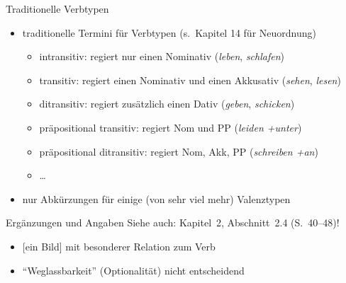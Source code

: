 \begin{frame}
  {Traditionelle Verbtypen}
  \pause
  \begin{itemize}[<+->]
    \item traditionelle Termini für Verbtypen (s.\ Kapitel 14 für Neuordnung)
      \Halbzeile
      \begin{itemize}[<+->]
        \item \alert{intransitiv}: regiert nur einen Nominativ (\textit{leben}, \textit{schlafen})
          \Viertelzeile
        \item \alert{transitiv}: regiert einen Nominativ und einen Akkusativ (\textit{sehen}, \textit{lesen})
          \Viertelzeile
        \item \alert{ditransitiv}: regiert zusätzlich einen Dativ (\textit{geben}, \textit{schicken})
          \Viertelzeile
        \item \alert{präpositional transitiv}: regiert Nom und PP (\textit{leiden +unter})
          \Viertelzeile
        \item \alert{präpositional ditransitiv}: regiert Nom, Akk, PP (\textit{schreiben +an})
          \Viertelzeile
        \item \ldots
          \Zeile
      \end{itemize}
    \item nur Abkürzungen für einige (von sehr viel mehr) \alert{Valenztypen}
  \end{itemize}
\end{frame}

\begin{frame}
  {Ergänzungen und Angaben}
  \pause
  Siehe auch: Kapitel~2, Abschnitt~2.4 (S.~40--48)!\\
  \pause\Halbzeile
  \begin{exe}
    \ex\label{ex:valenz034}
    \begin{xlist}
      \pause
      \pause
      \pause
    \end{xlist}
  \end{exe}
  \pause\Halbzeile
  \begin{itemize}[<+->]
    \item \alert{[ein Bild]} mit besonderer Relation zum Verb
    \item "`Weglassbarkeit"' (Optionalität) nicht entscheidend
  \end{itemize}
\end{frame}

